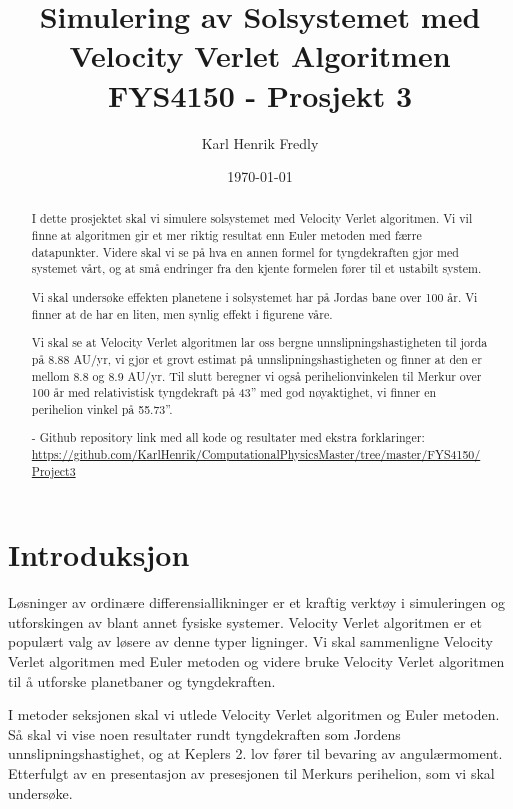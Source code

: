 \documentclass[reprint,english,notitlepage]{revtex4-1}
\begin{document}
	
\title{Simulering av Solsystemet med Velocity Verlet Algoritmen \\
	\normalsize FYS4150 - Prosjekt 3}
\date{\today}               
\author{Karl Henrik Fredly}

\newpage
	
\begin{abstract} %
	I dette prosjektet skal vi simulere solsystemet med Velocity Verlet algoritmen. Vi vil finne at algoritmen gir et mer riktig resultat enn Euler metoden med færre datapunkter. Videre skal vi se på hva en annen formel for tyngdekraften gjør med systemet vårt, og at små endringer fra den kjente formelen fører til et ustabilt system.
	
	Vi skal undersøke effekten planetene i solsystemet har på Jordas bane over 100 år. Vi finner at de har en liten, men synlig effekt i figurene våre.
	
	Vi skal se at Velocity Verlet algoritmen lar oss bergne unnslipningshastigheten til jorda på 8.88 AU/yr, vi gjør et grovt estimat på unnslipningshastigheten og finner at den er mellom 8.8 og 8.9 AU/yr. Til slutt beregner vi også perihelionvinkelen til Merkur over 100 år med relativistisk tyngdekraft på 43'' med god nøyaktighet, vi finner en perihelion vinkel på 55.73''.
	
	- Github repository link med all kode og resultater med ekstra forklaringer: \href{https://github.com/KarlHenrik/ComputationalPhysicsMaster/tree/master/FYS4150/Project3}{https://github.com/KarlHenrik/ComputationalPhysicsMaster/tree/master/FYS4150/Project3}
\end{abstract}
\maketitle

\section{Introduksjon} %
	Løsninger av ordinære differensiallikninger er et kraftig verktøy i simuleringen og utforskingen av blant annet fysiske systemer. Velocity Verlet algoritmen er et populært valg av løsere av denne typer ligninger. Vi skal sammenligne Velocity Verlet algoritmen med Euler metoden og videre bruke Velocity Verlet algoritmen til å utforske planetbaner og tyngdekraften.
	
	I metoder seksjonen skal vi utlede Velocity Verlet algoritmen og Euler metoden. Så skal vi vise noen resultater rundt tyngdekraften som Jordens unnslipningshastighet, og at Keplers 2. lov fører til bevaring av angulærmoment. Etterfulgt av en presentasjon av presesjonen til Merkurs perihelion, som vi skal undersøke.
	
\end{document}
